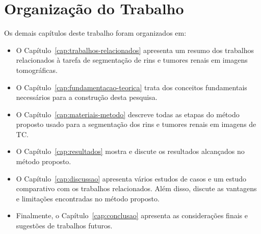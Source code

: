 \section{Organização do Trabalho}
\label{sec:organizacao-do-trabalho}

Os demais capítulos deste trabalho foram organizados em:

\begin{itemize}
    \item O Capítulo~\ref{cap:trabalhos-relacionados} apresenta um resumo dos trabalhos relacionados à tarefa de segmentação de rins e tumores renais em imagens tomográficas.
    \item O Capítulo~\ref{cap:fundamentacao-teorica} trata dos conceitos fundamentais necessários para a construção desta pesquisa.
    \item O Capítulo~\ref{cap:materiais-metodo} descreve todas as etapas do método proposto usado para a segmentação dos rins e tumores renais em imagens de TC.
    \item O Capítulo~\ref{cap:resultados} mostra e discute os resultados alcançados no método proposto.
    \item O Capítulo~\ref{cap:discussao} apresenta vários estudos de casos e um estudo comparativo com os trabalhos relacionados. Além disso, discute as vantagens e limitações encontradas no método proposto.
    \item Finalmente, o Capítulo~\ref{cap:conclusao} apresenta as considerações finais e sugestões de trabalhos futuros.
\end{itemize}